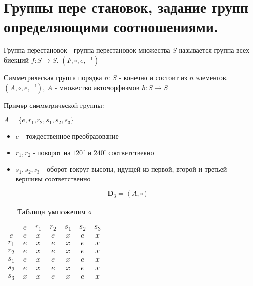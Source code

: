 \documentclass[../main/document.tex]{subfiles}
\begin{document}
\section{Группы пере становок, задание групп определяющими соотношениями.}
\begin{dfn}
Группа перестановок - группа перестановок множества $S$ называется группа всех биекций $f:S\rightarrow S$. $(F,\circ,e,{ }^{-1})$
\end{dfn}
\begin{exm}
\end{exm}
\begin{dfn}
Симметрическая группа порядка $n$: $S$ - конечно и состоит из $n$ элементов. $(A,\circ,e,{ }^{-1})$, $A$ - множество автоморфизмов $h:S\rightarrow S$
\end{dfn}
\begin{exm} \label{TriangleGroup}
Пример симметрической группы:


$A=\{e,r_1,r_2,s_1,s_2,s_3\}$
\begin{itemize}

  \item $e$ - тождественное преобразование
  \item $r_1, r_2$ - поворот на $120^{\circ}$ и $240^{\circ}$ соответственно
  \item $s_1, s_2, s_3$ - оборот вокруг высоты, идущей из первой, второй и третьей вершины соответственно
\end{itemize}

$$\mathbf{D}_3=(A,\circ)$$

\begin{table}[H]
\centering
\caption*{Таблица умножения $\circ$}
\renewcommand*{\arraystretch}{1.4}
\begin{tabular}{c|c|c|c|c|c|c}
  & $e$ & $r_1$ & $r_2$ & $s_1$& $s_2$ & $s_3$  \\ \hline
$e$ & $e$ & $x$ & $e$ & $x$& $e$ & $x$ \\ \hline
$r_1$ & $e$ & $x$ & $e$ & $x$& $e$ & $x$ \\ \hline
$r_2$ & $e$ & $x$ & $e$ & $x$& $e$ & $x$ \\ \hline
$s_1$ & $e$ & $x$ & $e$ & $x$& $e$ & $x$ \\ \hline
$s_2$ & $e$ & $x$ & $e$ & $x$& $e$ & $x$ \\ \hline
$s_3$ & $x$ & $x$& $e$ & $x$& $e$ & $x$ \\ 
\end{tabular}
\end{table}
\end{exm}

\begin{exm}

\end{exm}
\end{document}
